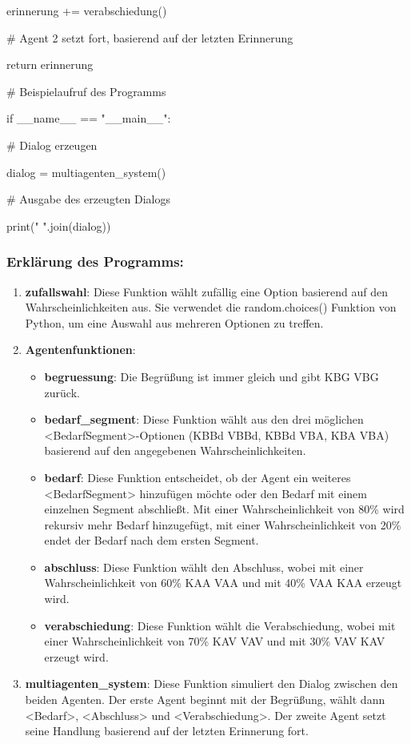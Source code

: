 \documentclass[
]{article}
\begin{document}
erinnerung += verabschiedung()

\# Agent 2 setzt fort, basierend auf der letzten Erinnerung

return erinnerung

\# Beispielaufruf des Programms

if \_\_name\_\_ == "\_\_main\_\_":

\# Dialog erzeugen

dialog = multiagenten\_system()

\# Ausgabe des erzeugten Dialogs

print(" ".join(dialog))

\subsubsection{\texorpdfstring{\textbf{Erklärung des
Programms:}}{Erklärung des Programms:}}\label{erkluxe4rung-des-programms-2}

\begin{enumerate}
\def\labelenumi{\arabic{enumi}.}
\item
  \textbf{zufallswahl}: Diese Funktion wählt zufällig eine Option
  basierend auf den Wahrscheinlichkeiten aus. Sie verwendet die
  random.choices() Funktion von Python, um eine Auswahl aus mehreren
  Optionen zu treffen.
\item
  \textbf{Agentenfunktionen}:

  \begin{itemize}
  \item
    \textbf{begruessung}: Die Begrüßung ist immer gleich und gibt KBG
    VBG zurück.
  \item
    \textbf{bedarf\_segment}: Diese Funktion wählt aus den drei
    möglichen \textless BedarfSegment\textgreater-Optionen (KBBd VBBd,
    KBBd VBA, KBA VBA) basierend auf den angegebenen
    Wahrscheinlichkeiten.
  \item
    \textbf{bedarf}: Diese Funktion entscheidet, ob der Agent ein
    weiteres \textless BedarfSegment\textgreater{} hinzufügen möchte
    oder den Bedarf mit einem einzelnen Segment abschließt. Mit einer
    Wahrscheinlichkeit von 80\% wird rekursiv mehr Bedarf hinzugefügt,
    mit einer Wahrscheinlichkeit von 20\% endet der Bedarf nach dem
    ersten Segment.
  \item
    \textbf{abschluss}: Diese Funktion wählt den Abschluss, wobei mit
    einer Wahrscheinlichkeit von 60\% KAA VAA und mit 40\% VAA KAA
    erzeugt wird.
  \item
    \textbf{verabschiedung}: Diese Funktion wählt die Verabschiedung,
    wobei mit einer Wahrscheinlichkeit von 70\% KAV VAV und mit 30\% VAV
    KAV erzeugt wird.
  \end{itemize}
\item
  \textbf{multiagenten\_system}: Diese Funktion simuliert den Dialog
  zwischen den beiden Agenten. Der erste Agent beginnt mit der
  Begrüßung, wählt dann \textless Bedarf\textgreater,
  \textless Abschluss\textgreater{} und
  \textless Verabschiedung\textgreater. Der zweite Agent setzt seine
  Handlung basierend auf der letzten Erinnerung fort.
\end{enumerate}
\end{document}
